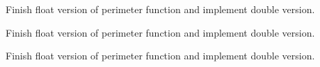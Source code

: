 
\begin{DoxyRefList}
\item[\label{todo__todo000001}%
\Hypertarget{todo__todo000001}%
Class \mbox{\hyperlink{classA}{A}} ]Finish float version of perimeter function and implement double version. 

Finish float version of perimeter function and implement double version.  
\item[\label{todo__todo000002}%
\Hypertarget{todo__todo000002}%
Class \mbox{\hyperlink{classSquareBoard}{Square\+Board$<$ T $>$}} ]Finish float version of perimeter function and implement double version. 
\end{DoxyRefList}
